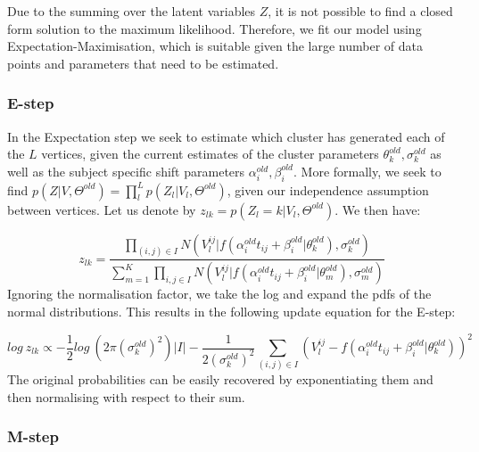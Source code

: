 Due to the summing over the latent variables $Z$, it is not possible to find a closed form solution to the maximum likelihood. Therefore, we fit our model using Expectation-Maximisation, which is suitable given the large number of data points and parameters that need to be estimated. 


\subsubsection{E-step}

In the Expectation step we seek to estimate which cluster has generated each of the $L$ vertices, given the current estimates of the cluster parameters $\theta_k^{old}, \sigma_k^{old}$ as well as the subject specific shift parameters $\alpha_i^{old}, \beta_i^{old}$. More formally, we seek to find $p(Z|V,\Theta^{old}) = \prod_l^L p(Z_l|V_l,\Theta^{old})$, given our independence assumption between vertices. Let us denote by $z_{lk} = p(Z_l = k | V_l,\Theta^{old})$. We then have:

\begin{equation}
 z_{lk} =  \frac{\prod_{(i,j) \in I} N(V_l^{ij} | f(\alpha_i^{old} t_{ij} + \beta_i^{old} | \theta_k^{old}), \sigma_k^{old})}{\sum_{m=1}^K \prod_{i,j \in I} N(V_l^{ij} | f(\alpha_i^{old} t_{ij} + \beta_i^{old} | \theta_m^{old}), \sigma_m^{old})}
\end{equation}
Ignoring the normalisation factor, we take the log and expand the pdfs of the normal distributions. This results in the following update equation for the E-step:

\begin{equation}
 log\ z_{lk} \propto  -\frac{1}{2} log\ (2 \pi \left(\sigma_k^{old}\right)^2) |I| - \frac{1}{2\left(\sigma_k^{old}\right)^2} \sum_{(i,j) \in I} (V_l^{ij} - f(\alpha_i^{old} t_{ij} + \beta_i^{old} | \theta_k^{old}))^2 
\end{equation}
The original probabilities can be easily recovered by exponentiating them and then normalising with respect to their sum.

\subsubsection{M-step}


